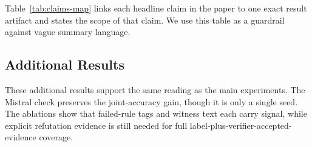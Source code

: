 Table~\ref{tab:claims-map} links each headline claim in the paper to one exact result artifact and states the scope of that claim. We use this table as a guardrail against vague summary language.

\begin{table}[t]
\centering
\small

\caption{Claim-to-evidence map for the main paper. Each row states one headline claim, the exact number or table that supports it, and the scope of that evidence.}
\label{tab:claims-map}
\end{table}

\subsection{Additional Results}
\label{app:additional-results}

\begin{table}[t]
\centering
\small

\caption{Additional backbone check at 4k training examples. Qwen2.5-7B rows use
three seeds; Mistral-7B rows are a single seed.}
\label{tab:backbone-check}
\end{table}

\begin{table}[t]
\centering
\small

\caption{Qwen2.5-7B support-deletion results by deleted support type.}
\label{tab:support-deletion-breakdown}
\end{table}

\begin{table}[t]
\centering
\small

\caption{Ablations on the abstention target.}
\label{tab:ablation-results}
\end{table}

\begin{table}[t]
\centering
\small

\caption{Single-seed 4k ablation of explicit refutation evidence.}
\label{tab:refute-ablation-results}
\end{table}

\begin{table}[t]
\centering
\small

\caption{Transfer across additional ProofWriter test configurations.}
\label{tab:transfer-results}
\end{table}

These additional results support the same reading as the main experiments. The
Mistral check preserves the joint-accuracy gain, though it is only a single
seed. The ablations show that failed-rule tags and witness text each carry
signal, while explicit refutation evidence is still needed for full
label-plus-verifier-accepted-evidence coverage.

